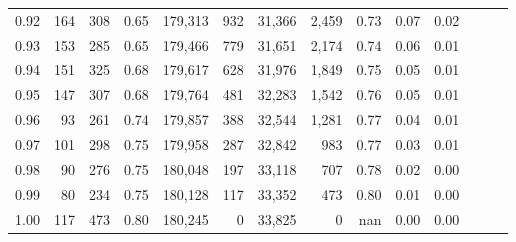 \begin{tabular}{rrrrrrrrrrrrrr}
0.92 &    164 &  308 &  0.65 &  179,313 &      932 &  31,366 &   2,459 &  0.73 &  0.07 &      0.02 \\
0.93 &    153 &  285 &  0.65 &  179,466 &      779 &  31,651 &   2,174 &  0.74 &  0.06 &      0.01 \\
0.94 &    151 &  325 &  0.68 &  179,617 &      628 &  31,976 &   1,849 &  0.75 &  0.05 &      0.01 \\
0.95 &    147 &  307 &  0.68 &  179,764 &      481 &  32,283 &   1,542 &  0.76 &  0.05 &      0.01 \\
0.96 &     93 &  261 &  0.74 &  179,857 &      388 &  32,544 &   1,281 &  0.77 &  0.04 &      0.01 \\
0.97 &    101 &  298 &  0.75 &  179,958 &      287 &  32,842 &     983 &  0.77 &  0.03 &      0.01 \\
0.98 &     90 &  276 &  0.75 &  180,048 &      197 &  33,118 &     707 &  0.78 &  0.02 &      0.00 \\
0.99 &     80 &  234 &  0.75 &  180,128 &      117 &  33,352 &     473 &  0.80 &  0.01 &      0.00 \\
1.00 &    117 &  473 &  0.80 &  180,245 &        0 &  33,825 &       0 &   nan &  0.00 &      0.00 \\
\bottomrule
\end{tabular}

